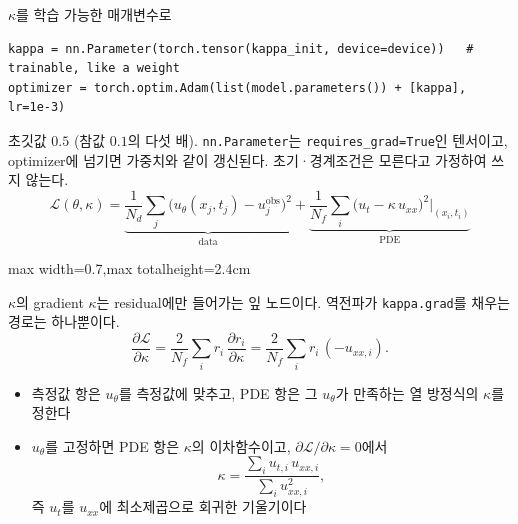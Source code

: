 \documentclass[aspectratio=169,11pt]{beamer}
\newcommand{\loss}{\mathcal{L}}
\newcommand{\pd}[2]{\frac{\partial #1}{\partial #2}}
\begin{document}
\begin{frame}[fragile]{$\kappa$를 학습 가능한 매개변수로}
\begin{lstlisting}
kappa = nn.Parameter(torch.tensor(kappa_init, device=device))   # trainable, like a weight
optimizer = torch.optim.Adam(list(model.parameters()) + [kappa], lr=1e-3)
\end{lstlisting}
\small 초깃값 $0.5$ (참값 $0.1$의 다섯 배). \texttt{nn.Parameter}는 \texttt{requires\_grad=True}인 텐서이고, optimizer에 넘기면 가중치와 같이 갱신된다.
초기·경계조건은 모른다고 가정하여 쓰지 않는다.
\[
\loss(\theta,\kappa)=\underbrace{\frac1{N_d}\sum_{j}\big(u_\theta(x_j,t_j)-u^{\text{obs}}_j\big)^2}_{\text{data}}
+\underbrace{\frac1{N_f}\sum_i\big(u_t-\kappa\,u_{xx}\big)^2\Big|_{(x_i,t_i)}}_{\text{PDE}}
\]
\centering
\begin{adjustbox}{max width=0.7\linewidth,max totalheight=2.4cm}
\end{adjustbox}
\end{frame}

\begin{frame}{$\kappa$의 gradient}
$\kappa$는 residual에만 들어가는 잎 노드이다. 역전파가 \texttt{kappa.grad}를 채우는 경로는 하나뿐이다.
\[
\pd{\loss}{\kappa}=\frac{2}{N_f}\sum_i r_i\,\pd{r_i}{\kappa}=\frac{2}{N_f}\sum_i r_i\,(-u_{xx,i}).
\]
\begin{itemize}
\item 측정값 항은 $u_\theta$를 측정값에 맞추고, PDE 항은 그 $u_\theta$가 만족하는 열 방정식의 $\kappa$를 정한다
\item $u_\theta$를 고정하면 PDE 항은 $\kappa$의 이차함수이고, $\partial\loss/\partial\kappa=0$에서
\[
\kappa=\frac{\sum_i u_{t,i}\,u_{xx,i}}{\sum_i u_{xx,i}^2},
\]
즉 $u_t$를 $u_{xx}$에 최소제곱으로 회귀한 기울기이다
\end{itemize}
\end{frame}
\end{document}
